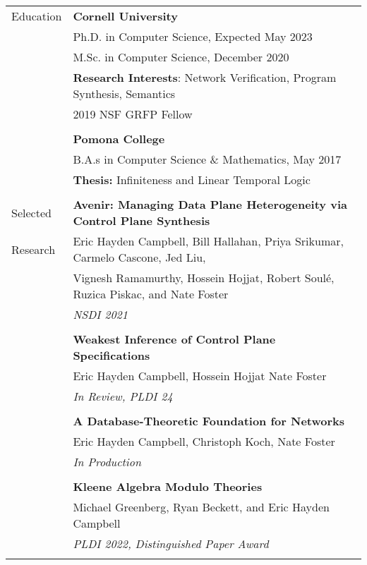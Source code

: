 \documentclass[letterpaper,10pt,oneside]{article}
\begin{document}
\noindent
\begin{tabular}{@{} l l}
  \Large{Education} 
  & \textbf{Cornell University} \\
  & Ph.D. in Computer Science, Expected May 2023 \\
  & M.Sc. in Computer Science, December 2020 \\
  & \textbf{Research Interests}: Network Verification, Program Synthesis, Semantics \\
  & 2019 NSF GRFP Fellow \\
  \\


  & \textbf{Pomona College} \\
  & B.A.s in Computer Science \& Mathematics, May 2017 \\
  & \textbf{Thesis:} Infiniteness and Linear Temporal Logic \\
  & \\



  \Large{Selected}
  & \textbf{Avenir: Managing Data Plane Heterogeneity via Control Plane Synthesis}\\
  \Large{Research}
  & Eric Hayden Campbell, Bill Hallahan, Priya Srikumar, Carmelo Cascone, Jed Liu, \\ & Vignesh Ramamurthy, Hossein Hojjat, Robert  Soul\'{e}, Ruzica Piskac,  and  Nate Foster\\
  & \textit{NSDI 2021} \\
  &\\

  & \textbf{Weakest Inference of Control Plane Specifications} \\
  & Eric Hayden Campbell, Hossein Hojjat Nate Foster \\
  & \textit{In Review, PLDI 24} \\
  & \\

  & \textbf{A Database-Theoretic Foundation for Networks} \\
  & Eric Hayden Campbell, Christoph Koch, Nate Foster \\
  & \textit{In Production} \\
  & \\


  & \textbf{Kleene Algebra Modulo Theories} \\
  & Michael Greenberg, Ryan Beckett, and Eric Hayden Campbell \\
  & \textit{PLDI 2022, Distinguished Paper Award} \\
  &\\


\end{tabular}
\end{document}
